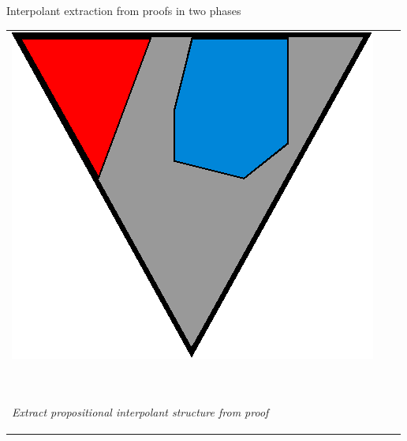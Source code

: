 \documentclass[final,hyperref={pdfpagelabels=true}]{beamer}
\begin{document}
\begin{frame}
\begin{columns}[t]
\begin{column}{\mycolwidth}
\begin{block}{Interpolant extraction from proofs in two phases \cite{Huang95}}
\begin{tabular}{p{}ll}
					\multicolumn{1}{m{\fakemulticolwidth}}{
						\includegraphics[width=\proofwidth]{figures/two_phase_draft_proof}
					}
					&
						\vspace*{0.5em}
					\\

					\multicolumn{2}{l}{
						\proofindent{\stagearrow} ~\parbox[c]{14em}{\raggedright \emph{ Extract propositional interpolant structure from proof}}
						\vspace*{0.5em}
				}
				 \\
			 


\end{tabular}
\end{block}
\end{column}
\end{columns}
\end{frame}
\end{document}
